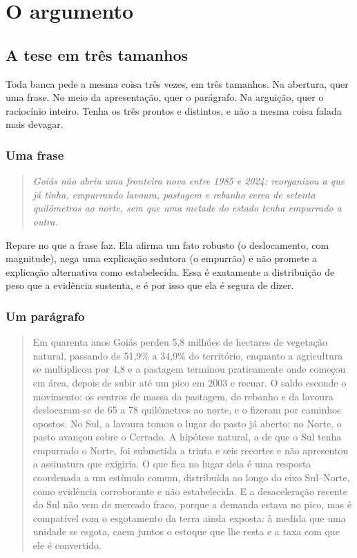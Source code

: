 \part{O argumento}

\chapter{A tese em três tamanhos}

Toda banca pede a mesma coisa três vezes, em três tamanhos. Na abertura, quer
uma frase. No meio da apresentação, quer o parágrafo. Na arguição, quer o
raciocínio inteiro. Tenha os três prontos e distintos, e não a mesma coisa
falada mais devagar.

\section{Uma frase}

\begin{quote}\itshape\color{cortinta}
Goiás não abriu uma fronteira nova entre 1985 e 2024: reorganizou a que já
tinha, empurrando lavoura, pastagem e rebanho cerca de setenta quilômetros ao
norte, sem que uma metade do estado tenha empurrado a outra.
\end{quote}

Repare no que a frase faz. Ela afirma um fato robusto (o deslocamento, com
magnitude), nega uma explicação sedutora (o empurrão) e não promete a
explicação alternativa como estabelecida. Essa é exatamente a distribuição de
peso que a evidência sustenta, e é por isso que ela é segura de dizer.

\section{Um parágrafo}

\begin{quote}\color{cortinta}
Em quarenta anos Goiás perdeu 5,8 milhões de hectares de vegetação natural,
passando de 51,9\% a 34,9\% do território, enquanto a agricultura se
multiplicou por 4,8 e a pastagem terminou praticamente onde começou em área,
depois de subir até um pico em 2003 e recuar. O saldo esconde o movimento: os
centros de massa da pastagem, do rebanho e da lavoura deslocaram-se de 65 a 78
quilômetros ao norte, e o fizeram por caminhos opostos. No Sul, a lavoura tomou
o lugar do pasto já aberto; no Norte, o pasto avançou sobre o Cerrado. A
hipótese natural, a de que o Sul tenha empurrado o Norte, foi submetida a
trinta e seis recortes e não apresentou a assinatura que exigiria. O que fica
no lugar dela é uma resposta coordenada a um estímulo comum, distribuída ao
longo do eixo Sul--Norte, como evidência corroborante e não estabelecida. E a
desaceleração recente do Sul não vem de mercado fraco, porque a demanda estava
no pico, mas é compatível com o esgotamento da terra ainda exposta: à medida
que uma unidade se esgota, caem juntos o estoque que lhe resta e a taxa com que
ele é convertido.
\end{quote}

